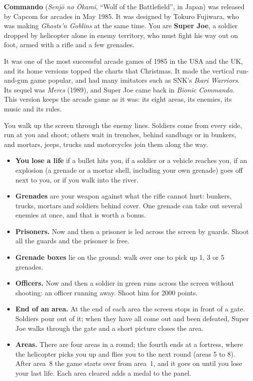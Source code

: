 
\textbf{Commando} (\textit{Senj\=o no \=Okami}, ``Wolf of the Battlefield'', in Japan) was released by Capcom for arcades
in May 1985. It was designed by Tokuro Fujiwara, who was making \textit{Ghosts'n Goblins} at the same time. You are
\textbf{Super Joe}, a soldier dropped by helicopter alone in enemy territory, who must fight his way out on foot, armed with a
rifle and a few grenades.

It was one of the most successful arcade games of 1985 in the USA and the UK, and its home versions topped the charts
that Christmas. It made the vertical run-and-gun game popular, and had many imitators such as SNK's \textit{Ikari Warriors}.
Its sequel was \textit{Mercs} (1989), and Super Joe came back in \textit{Bionic Commando}. This version keeps the arcade
game as it was: its eight areas, its enemies, its music and its rules.


You walk up the screen through the enemy lines. Soldiers come from every side, run at you and shoot; others wait in
trenches, behind sandbags or in bunkers, and mortars, jeeps, trucks and motorcycles join them along the way.

\begin{itemize}
\item \textbf{You lose a life} if a bullet hits you, if a soldier or a vehicle reaches you, if an explosion (a grenade or a
mortar shell, including your own grenade) goes off next to you, or if you walk into the river.
\item \textbf{Grenades} are your weapon against what the rifle cannot hurt: bunkers, trucks, mortars and soldiers behind
cover. One grenade can take out several enemies at once, and that is worth a bonus.
\item \textbf{Prisoners.} Now and then a prisoner is led across the screen by guards. Shoot all the guards and the prisoner
is free.
\item \textbf{Grenade boxes} lie on the ground: walk over one to pick up 1, 3 or 5 grenades.
\item \textbf{Officers.} Now and then a soldier in green runs across the screen without shooting: an officer running away.
Shoot him for 2000 points.
\item \textbf{End of an area.} At the end of each area the screen stops in front of a gate. Soldiers pour out of it; when
they have all come out and been defeated, Super Joe walks through the gate and a short picture closes the area.
\item \textbf{Areas.} There are four areas in a round; the fourth ends at a fortress, where the helicopter picks you up and
flies you to the next round (areas 5 to 8). After area~8 the game starts over from area~1, and it goes on until you lose your
last life. Each area cleared adds a medal to the panel.
\end{itemize}

